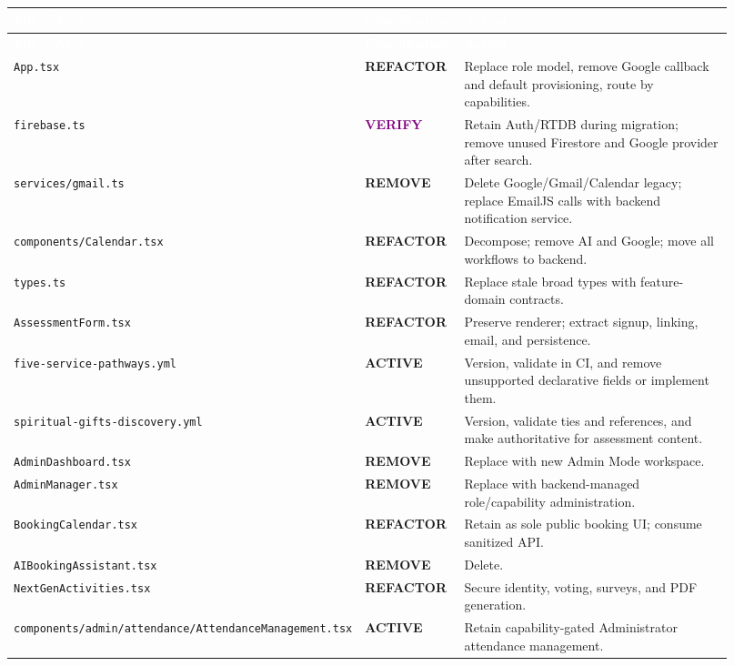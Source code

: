 \documentclass[11pt,a4paper,oneside]{report}
\newcommand{\statusactive}{\textcolor{notegreen}{\textbf{ACTIVE}}}
\newcommand{\statusrefactor}{\textcolor{accent!80!black}{\textbf{REFACTOR}}}
\newcommand{\statusremove}{\textcolor{warnred}{\textbf{REMOVE}}}
\newcommand{\statusverify}{\textcolor{purple}{\textbf{VERIFY}}}
\begin{document}
\begin{longtable}{@{}p{0.30\linewidth} p{0.14\linewidth} p{0.48\linewidth}@{}}
\toprule
\rowcolor{primary}
\textcolor{white}{\textbf{File / Area}} & \textcolor{white}{\textbf{Classification}} & \textcolor{white}{\textbf{Action}} \\
\midrule
\endfirsthead
\toprule
\rowcolor{primary}
\textcolor{white}{\textbf{File / Area}} & \textcolor{white}{\textbf{Classification}} & \textcolor{white}{\textbf{Action}} \\
\midrule
\endhead
\texttt{App.tsx} & \statusrefactor & Replace role model, remove Google callback and default provisioning, route by capabilities. \\
\texttt{firebase.ts} & \statusverify & Retain Auth/RTDB during migration; remove unused Firestore and Google provider after search. \\
\texttt{services/gmail.ts} & \statusremove & Delete Google/Gmail/Calendar legacy; replace EmailJS calls with backend notification service. \\
\texttt{components/Calendar.tsx} & \statusrefactor & Decompose; remove AI and Google; move all workflows to backend. \\
\texttt{types.ts} & \statusrefactor & Replace stale broad types with feature-domain contracts. \\
\texttt{AssessmentForm.tsx} & \statusrefactor & Preserve renderer; extract signup, linking, email, and persistence. \\
\texttt{five-service-pathways.yml} & \statusactive & Version, validate in CI, and remove unsupported declarative fields or implement them. \\
\texttt{spiritual-gifts-discovery.yml} & \statusactive & Version, validate ties and references, and make authoritative for assessment content. \\
\texttt{AdminDashboard.tsx} & \statusremove & Replace with new Admin Mode workspace. \\
\texttt{AdminManager.tsx} & \statusremove & Replace with backend-managed role/capability administration. \\
\texttt{BookingCalendar.tsx} & \statusrefactor & Retain as sole public booking UI; consume sanitized API. \\
\texttt{AIBookingAssistant.tsx} & \statusremove & Delete. \\
\texttt{NextGenActivities.tsx} & \statusrefactor & Secure identity, voting, surveys, and PDF generation. \\
\texttt{components/admin/attendance/AttendanceManagement.tsx} & \statusactive & Retain capability-gated Administrator attendance management. \\

\end{longtable}
\end{document}
